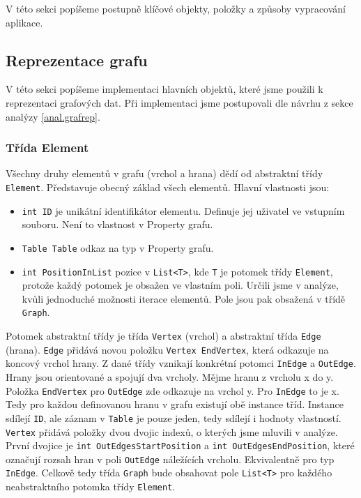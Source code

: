 V této sekci popíšeme postupně klíčové objekty, položky a způsoby vypracování aplikace.  

\subsection{Reprezentace grafu}

V této sekci popíšeme implementaci hlavních objektů, které jsme použili k reprezentaci grafových dat.
Při implementaci jsme postupovali dle návrhu z sekce analýzy \ref{anal.grafrep}.

\subsubsection{Třída Element}

Všechny druhy elementů v grafu (vrchol a hrana) dědí od abstraktní třídy \texttt{Element}.
Představuje obecný základ všech elementů.
Hlavní vlastnosti jsou:
\begin{itemize}
\item \texttt{int ID} je unikátní identifikátor elementu. Definuje jej uživatel ve vstupním souboru. Není to vlastnost v Property grafu.
\item \texttt{Table Table} odkaz na typ v Property grafu.
\item \texttt{int PositionInList} pozice v \texttt{List<T>}, kde \texttt{T} je potomek třídy \texttt{Element}, protože každý potomek je obsažen ve vlastním poli.
Určili jsme v analýze, kvůli jednoduché možnosti iterace elementů.
Pole jsou pak obsažená v třídě \texttt{Graph}.
\end{itemize}

Potomek abstraktní třídy je třída \texttt{Vertex} (vrchol) a abstraktní třída \texttt{Edge} (hrana).
\texttt{Edge} přidává novou položku \texttt{Vertex EndVertex}, která odkazuje na koncový vrchol hrany.
Z dané třídy vznikají konkrétní potomci \texttt{InEdge} a \texttt{OutEdge}.
Hrany jsou orientované a spojují dva vrcholy.
Mějme hranu z vrcholu x do y.
Položka \texttt{EndVertex} pro \texttt{OutEdge} zde odkazuje na vrchol y.
Pro \texttt{InEdge} to je x.
Tedy pro každou definovanou hranu v grafu existují obě instance tříd. 
Instance sdílejí \texttt{ID}, ale záznam v \texttt{Table} je pouze jeden, tedy sdílejí i hodnoty vlastností. 
\texttt{Vertex} přidává položky dvou dvojic indexů, o kterých jsme mluvili v analýze.
První dvojice je \texttt{int OutEdgesStartPosition} a \texttt{int OutEdgesEndPosition}, které označují rozsah hran v poli \texttt{OutEdge} náležících vrcholu.
Ekvivalentně pro typ \texttt{InEdge}.
Celkově tedy třída \texttt{Graph} bude obsahovat pole \texttt{List<T>} pro každého neabstraktního potomka třídy \texttt{Element}.

